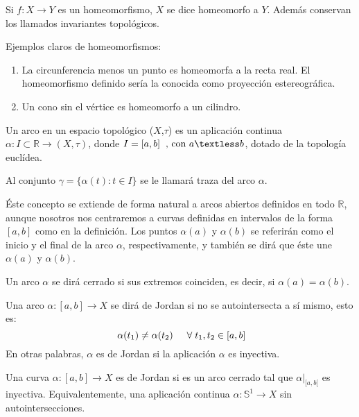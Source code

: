 Si $f : X \rightarrow Y$ es un homeomorfismo, $X$ se dice homeomorfo a $Y$. Además conservan los llamados invariantes topológicos.

Ejemplos claros de homeomorfismos:

\begin{enumerate}
	\item La circunferencia menos un punto es homeomorfa a la recta real. El homeomorfismo definido sería la conocida como proyección estereográfica.
	\item Un cono sin el vértice es homeomorfo a un cilindro.
\end{enumerate}

\begin{definition}
	Un arco en un espacio topológico ($X$,$\tau$) es un aplicación continua $\alpha: I\subset \mathbb{R} \rightarrow (X,\tau)$, donde $I = [a,b] \hspace{0.2cm} \text{, con } a \textless b$, dotado de la topología euclídea.
\end{definition}

Al conjunto $\gamma = \{ \alpha(t) : t \in I \}$ se le llamará traza del arco $\alpha$.

Éste concepto se extiende de forma natural a arcos abiertos definidos en todo $\mathbb{R}$, aunque nosotros nos centraremos a curvas definidas en intervalos de la forma $[a,b]$ como en la definición. Los puntos  $\alpha(a)$ y $\alpha(b)$ se referirán como el inicio y el final de la arco $\alpha$, respectivamente, y también se dirá que éste une $\alpha(a)$ y $\alpha(b)$.

\begin{definition}
	Un arco $\alpha$ se dirá cerrado si sus extremos coinciden, es decir, si $\alpha(a) = \alpha(b)$.
\end{definition}

\begin{definition}
	Una arco $\alpha\colon [a,b]\to X$ se dirá de Jordan si no se autointersecta a sí mismo, esto es:\[\ \alpha(t_1) \neq \alpha(t_2) \hspace{0.5cm}\forall \hspace{0.1cm}t_1,t_2 \in [a,b] \]
En otras palabras, $\alpha$ es de Jordan  si la aplicación $\alpha$ es inyectiva.
\end{definition}



\begin{definition}
	Una curva $\alpha : [a,b] \rightarrow X$ es de Jordan si es un arco cerrado tal que $\alpha \vert_{[a,b[}$ es inyectiva. Equivalentemente, una aplicación continua $\alpha : \mathbb{S}^1 \rightarrow X$ sin autointersecciones.
\end{definition}

